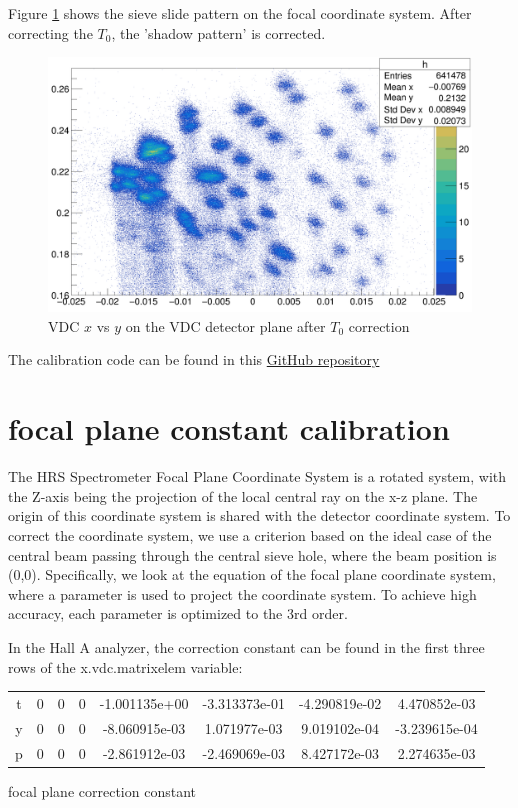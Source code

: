 Figure \ref{fig:vdc_t0_after_correction} shows the sieve slide pattern on the focal coordinate system. After correcting the $T_0$, the 'shadow pattern' is corrected.

\begin{figure}
\centering
\includegraphics[width=\textwidth]{images/chap4/vdc_t0_after_correction.png}
\caption{VDC $x$ vs $y$ on the VDC detector plane after $T_0$ correction}
\label{fig:vdc_t0_after_correction}
\end{figure}


The calibration code can be found in this \href{https://github.com/Jiansiyu/GeneralScripts/tree/master/VDC_T0_Cali}{GitHub repository}  



\section{focal plane constant calibration}

The HRS Spectrometer Focal Plane Coordinate System is a rotated system, with the Z-axis being the projection of the local central ray on the x-z plane. The origin of this coordinate system is shared with the detector coordinate system. To correct the coordinate system, we use a criterion based on the ideal case of the central beam passing through the central sieve hole, where the beam position is (0,0). Specifically, we look at the equation of the focal plane coordinate system, where a parameter is used to project the coordinate system. To achieve high accuracy, each parameter is optimized to the 3rd order.

In the Hall A analyzer, the correction constant can be found in the first three rows of the x.vdc.matrixelem variable:

\begin{center}
    \begin{tabular}{|c c c c | c c c c|} \hline
        t & 0 & 0 & 0 & -1.001135e+00 & -3.313373e-01 & -4.290819e-02 & 4.470852e-03 \\
        y & 0 & 0 & 0 & -8.060915e-03 & 1.071977e-03 & 9.019102e-04 & -3.239615e-04 \\
        p & 0 & 0 & 0 & -2.861912e-03 & -2.469069e-03 & 8.427172e-03 & 2.274635e-03 \\ \hline
    \end{tabular}
    \caption{focal plane correction constant}
\end{center}

